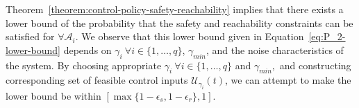 \documentclass[journal]{IEEEtran}
\begin{document}
Theorem~\ref{theorem:control-policy-safety-reachability} implies that there exists a lower bound of the probability that the safety and reachability constraints can be satisfied for $\forall \mathcal{A}_i$. 
We observe that this lower bound given in Equation~\eqref{eq:P_2-lower-bound} depends on $\gamma_i \ \forall i \in \{1,\ldots,q\}$, $\gamma_{min}$, and the noise characteristics of the system.
By choosing appropriate $\gamma_i \ \forall i \in \{1,\ldots,q\}$ and $\gamma_{min},$ and constructing corresponding set of feasible control inputs $\mathcal{U}_{\gamma_i}(t)$, we can attempt to make the lower bound be within $[\max \{1-\epsilon_s, 1-\epsilon_r\}, 1]$.
\end{document}
